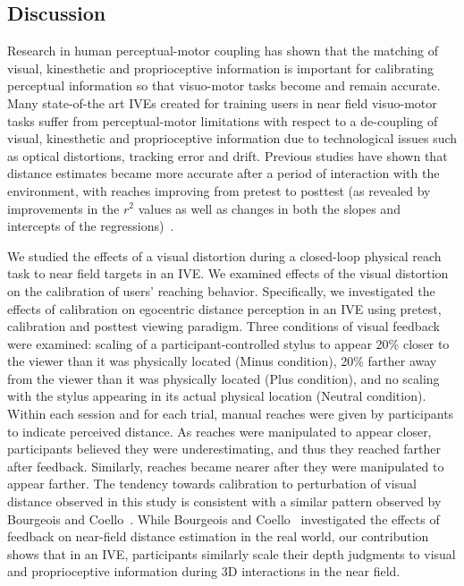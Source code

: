 \subsection{Discussion}

Research in human perceptual-motor coupling has shown that the matching of visual, kinesthetic and proprioceptive information is important for calibrating perceptual information so that visuo-motor tasks become and remain accurate. Many state-of-the art IVEs created for training users in near field visuo-motor tasks suffer from perceptual-motor limitations with respect to a de-coupling of visual, kinesthetic and proprioceptive information due to technological issues such as optical distortions, tracking error and drift. Previous studies have shown that distance estimates became more accurate after a period of interaction with the environment, with reaches improving from pretest to posttest (as revealed by improvements in the $r^2$ values as well as changes in both the slopes and intercepts of the regressions)~\cite{ANL+12,BP98,BR99,RW05,RW07}.

We studied the effects of a visual distortion during a closed-loop physical reach task to near field targets in an IVE. We examined effects of the visual distortion on the calibration of users' reaching behavior. Specifically, we investigated the effects of calibration on egocentric distance perception in an IVE using pretest, calibration and posttest viewing paradigm. Three conditions of visual feedback were examined: scaling of a participant-controlled stylus to appear 20\% closer to the viewer than it was physically located (Minus condition), 20\% farther away from the viewer than it was physically located (Plus condition), and no scaling with the stylus appearing in its actual physical location (Neutral condition). Within each session and for each trial, manual reaches were given by participants to indicate perceived distance. As reaches were manipulated to appear closer, participants believed they were underestimating, and thus they reached farther after feedback. Similarly, reaches became nearer after they were manipulated to appear farther. The tendency towards calibration to perturbation of visual distance observed in this study is consistent with a similar pattern observed by Bourgeois and Coello~\cite{BC12}. While Bourgeois and Coello~\cite{BC12} investigated the effects of feedback on near-field distance estimation in the real world, our contribution shows that in an IVE, participants similarly scale their depth judgments to visual and proprioceptive information during 3D interactions in the near field.

